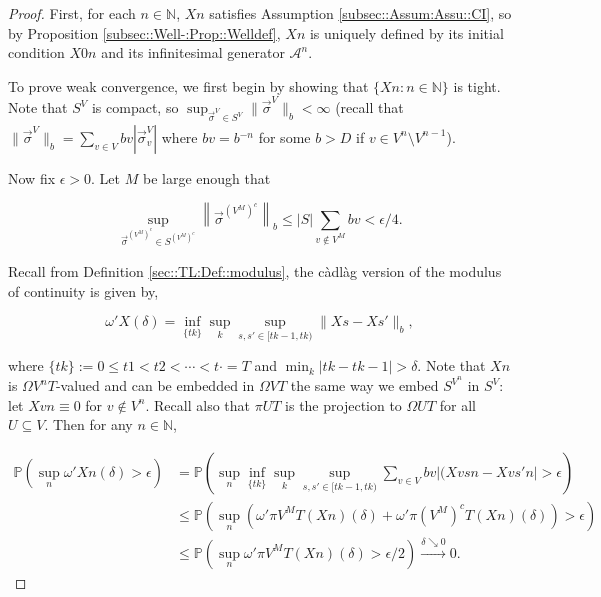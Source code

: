 \documentclass[12pt]{article}
\newcommand{\mb}{\mathbb}
\newcommand{\mc}{\mathcal}
\newcommand{\ra}{\rightarrow}
\newcommand{\os}{\overset}
\newcommand{\ep}{\epsilon}
\newcommand{\ind}{\hspace{24pt}}
\newcommand{\pr}{\mb{P}}							%
\renewcommand{\v}{v}							%
\renewcommand{\U}{U}							%
\renewcommand{\S}{S}							%
\newcommand{\s}{\sigma}							%
\newcommand{\sv}{\vec{\s}}						%
\renewcommand{\b}{b}							%
\newcommand{\T}{T}								%
\renewcommand{\t}{t}							%
\newcommand{\proj}{\pi}							%
\renewcommand{\tt}{s}							%
\newcommand{\ttt}{s'}							%
\newcommand{\X}{X}								%
\newcommand{\IG}{\mc{A}}						%
\newcommand{\carp}[1]{^{#1}}					%
\newcommand{\vsi}[1]{^{#1}}						%
\newcommand{\cind}[1]{_{#1}}					%
\newcommand{\degr}{D}							%
\newcommand{\sln}[1]{^{#1}}						%
\newcommand{\cconst}{M}							%
\newcommand{\cmodu}{\omega'}					%
\renewcommand{\it}{k}							%
\begin{document}
\begin{proof}
First, for each \(n\in\mb{N}\), \(\X{}{}{n}\) satisfies Assumption \ref{subsec::Assum:Assu::CI}, so by Proposition \ref{subsec::Well-:Prop::Welldef}, \(\X{}{}{n}\) is uniquely defined by its initial condition \(\X{}{0}{n}\) and its infinitesimal generator \(\IG\sln{n}\).

\ind To prove weak convergence, we first begin by showing that \(\{\X{}{}{n}:n\in \mb{N}\}\) is tight. Note that \(\S\carp{V}\) is compact, so \(\sup_{\sv\cind{}\vsi{V} \in \S\carp{V}} \|\sv\cind{}\vsi{V}\|_{\b{}} < \infty\) (recall that \(\|\sv\cind{}\vsi{V}\|_{\b{}} = \sum_{\v \in V} \b{\v} |\sv\cind{\v}\vsi{V}|\) where \(\b{\v} = \b{}^{-n}\) for some \(\b{} > \degr\) if \(\v \in V\sln{n}\setminus V\sln{n-1}\)).

\ind Now fix \(\ep > 0\). Let \(\cconst\) be large enough that

\[\sup_{\sv\cind{}\vsi{\left(V\sln{\cconst}\right)^c} \in \S\carp{\left(V\sln{\cconst}\right)^c}} \left\|\sv\cind{}\vsi{\left(V\sln{\cconst}\right)^c}\right\|_{\b{}} \leq |\S|\sum_{\v \notin V\sln{\cconst}} \b{\v} < \ep/4.\]

Recall from Definition \ref{sec::TL:Def::modulus}, the c\`adl\`ag version of the modulus of continuity is given by,

\[\cmodu{\X{}{}}(\delta) = \inf_{\{\t{\it}\}} \sup_\it \sup_{\tt,\ttt \in [\t{\it-1},\t{\it})} \|\X{}{\tt} - \X{}{\ttt}\|_{\b{}},\]

where \(\{\t{\it}\} := 0 \leq \t{1} < \t{2} < \cdots < \t{\cdot} = \T\) and \(\min_\it|\t{\it} - \t{\it-1}| > \delta\). Note that \(\X{}{}{n}\) is \(\Omega{V\sln{n}}{\T}\)-valued and can be embedded in \(\Omega{V}{\T}\) the same way we embed \(\S\carp{V\sln{n}}\) in \(\S\carp{V}\): let \(\X{\v}{}{n} \equiv 0\) for \(\v \notin V\sln{n}\). Recall also that \(\proj{\U}{\T}\) is the projection to \(\Omega{\U}{\T}\) for all \(\U\subseteq V\). Then for any \(n\in \mb{N}\),

\begin{align*}
\pr\left(\sup_n \cmodu{\X{}{}{n}}(\delta) > \epsilon\right) &= \pr\left(\sup_n\inf_{\{\t{\it}\}}\sup_\it\sup_{\tt,\ttt \in [\t{\it-1},\t{\it})} \sum_{\v \in V} \b{\v}|(\X{\v}{\tt}{n} - \X{\v}{\ttt}{n}| > \epsilon \right)\\
&\leq \pr\left(\sup_n \left(\cmodu{\proj{V\sln{\cconst}}{\T}(\X{}{}{n})}(\delta) + \cmodu{\proj{\left(V\sln{\cconst}\right)^c}{\T}(\X{}{}{n})}(\delta)\right) > \ep\right)\\
&\leq \pr\left(\sup_n \cmodu{\proj{V\sln{\cconst}}{\T}(\X{}{}{n})}(\delta) > \ep/2\right) \os{\delta\searrow 0}{\ra} 0.
\end{align*}


\end{proof}
\end{document}
